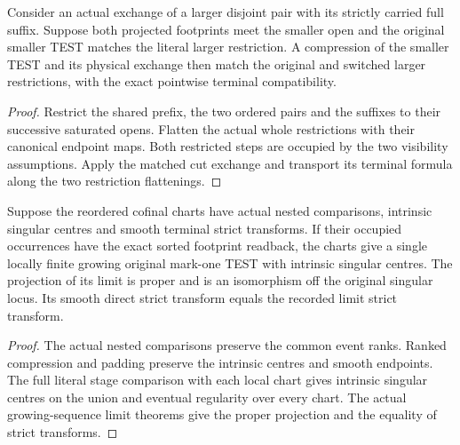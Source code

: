 \begin{theorem}
\label{hir:g8-literal-compressed-cut-exchange}
\leanok
Consider an actual exchange of a larger disjoint pair with its
strictly carried full suffix. Suppose both projected footprints meet
the smaller open and the original smaller TEST matches the literal
larger restriction. A compression of the smaller TEST and its
physical exchange then match the original and switched larger
restrictions, with the exact pointwise terminal compatibility.
\end{theorem}
\begin{proof}
Restrict the shared prefix, the two ordered pairs and the suffixes to
their successive saturated opens. Flatten the actual whole
restrictions with their canonical endpoint maps. Both restricted
steps are occupied by the two visibility assumptions. Apply the
matched cut exchange and transport its terminal formula along the
two restriction flattenings.
\end{proof}

\begin{theorem}
\label{hir:g8-matched-ranked-singular-endpoint}
\leanok
Suppose the reordered cofinal charts have actual nested comparisons,
intrinsic singular centres and smooth terminal strict transforms.
If their occupied occurrences have the exact sorted footprint
readback, the charts give a single locally finite growing original
mark-one TEST with intrinsic singular centres. The projection of
its limit is proper and is an isomorphism off the original singular
locus. Its smooth direct strict transform equals the recorded limit
strict transform.
\end{theorem}
\begin{proof}
The actual nested comparisons preserve the common event ranks.
Ranked compression and padding preserve the intrinsic centres and
smooth endpoints. The full literal stage comparison with each local
chart gives intrinsic singular centres on the union and eventual
regularity over every chart. The actual growing-sequence limit
theorems give the proper projection and the equality of strict
transforms.
\end{proof}

